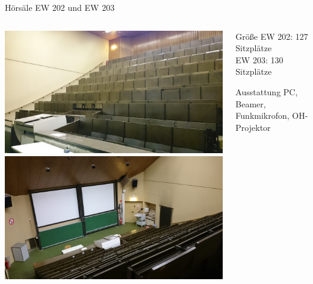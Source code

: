\documentclass[compress,]{beamer}
\begin{document}
\begin{frame}{Hörsäle EW 202 und EW 203}
  \begin{columns}[onlytextwidth]
    \begin{column}{0.5\textwidth}
      \includegraphics[width=\textwidth]{images/DSC_0714.JPG}\\
      \includegraphics[width=\textwidth]{images/DSC_0713.JPG}
    \end{column}
    \begin{column}{0.4\textwidth}
      \begin{block}{Größe}
        EW 202: 127 Sitzplätze\\
        EW 203: 130 Sitzplätze
      \end{block}
      \vspace{1cm}
      \begin{block}{Ausstattung}
        PC, Beamer, Funkmikrofon, OH-Projektor
      \end{block}
    \end{column}
  \end{columns}
\end{frame}
\end{document}
